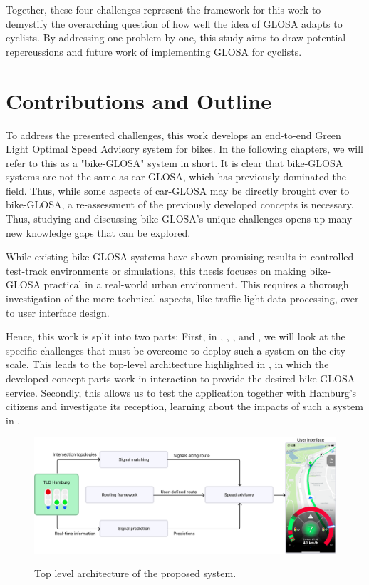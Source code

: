Together, these four challenges represent the framework for this work to demystify the overarching question of how well the idea of GLOSA adapts to cyclists. By addressing one problem by one, this study aims to draw potential repercussions and future work of implementing GLOSA for cyclists.

\section{Contributions and Outline}

To address the presented challenges, this work develops an end-to-end Green Light Optimal Speed Advisory system for bikes. In the following chapters, we will refer to this as a "bike-GLOSA" system in short. It is clear that bike-GLOSA systems are not the same as car-GLOSA, which has previously dominated the field. Thus, while some aspects of car-GLOSA may be directly brought over to bike-GLOSA, a re-assessment of the previously developed concepts is necessary. Thus, studying and discussing bike-GLOSA's unique challenges opens up many new knowledge gaps that can be explored.

While existing bike-GLOSA systems have shown promising results in controlled test-track environments or simulations, this thesis focuses on making bike-GLOSA practical in a real-world urban environment. This requires a thorough investigation of the more technical aspects, like traffic light data processing, over to user interface design. 

Hence, this work is split into two parts: First, in , , , and , we will look at the specific challenges that must be overcome to deploy such a system on the city scale. This leads to the top-level architecture highlighted in , in which the developed concept parts work in interaction to provide the desired bike-GLOSA service. Secondly, this allows us to test the application together with Hamburg's citizens and investigate its reception, learning about the impacts of such a system in .

\begin{figure}[h]
  \caption{Top level architecture of the proposed system.}
  \includegraphics[width=\linewidth]{images/outline.png}
  \label{fig:outline}
\end{figure}

